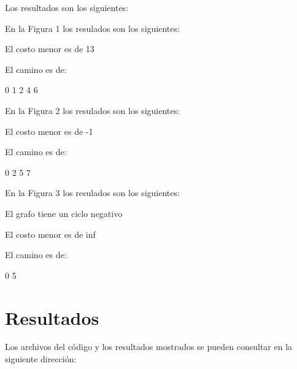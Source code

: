 \documentclass{report}
\begin{document}
\newpage
Los resultados son los siguientes: 

\begin{minipage}[b]{0.3\linewidth}

En la Figura 1 los resulados  son los siguientes:

El costo menor es de 13

El camino es de: 

0 1 2 4 6 
  \end{minipage}
  \hspace{0.5cm}
\begin{minipage}[b]{0.3\linewidth}
En la Figura 2 los resulados  son los siguientes:


  El costo menor es de -1

El camino es de: 

0 2 5 7 
\end{minipage}
\hspace{0.5cm}
\begin{minipage}[b]{0.3\linewidth}
En la Figura 3 los  resulados  son los siguientes:

  El grafo tiene un ciclo  negativo 

El costo menor es de inf 

El camino es de: 

0 5 
  \end{minipage}

\section*{Resultados}

Los archivos del código y los resultados mostrados se pueden consultar en la siguiente dirección: \href{}{}
\end{document}
